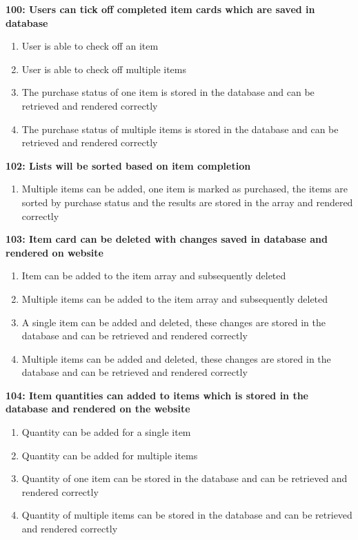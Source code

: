 \documentclass[10pt,onecolumn]{witseiepaper}
\begin{document}
\textbf{100: Users can tick off completed item cards which are saved in database}

\begin{enumerate}
	\item User is able to check off an item
	\item User is able to check off multiple items 
	\item The purchase status of one item is stored in the database and can be retrieved and rendered correctly 
	\item The purchase status of multiple items is stored in the database and can be retrieved and rendered correctly
\end{enumerate}

\textbf{102: Lists will be sorted based on item completion}

\begin{enumerate}
	\item Multiple items can be added, one item is marked as purchased, the items are sorted by purchase status and the results are stored in the array and rendered correctly
\end{enumerate}

\textbf{103: Item card can be deleted with changes saved in database and rendered on website}

\begin{enumerate}
	\item Item can be added to the item array and subsequently deleted
	\item Multiple items can be added to the item array and subsequently deleted
	\item A single item can be added and deleted, these changes are stored in the database and can be retrieved and rendered correctly
	\item Multiple items can be added and deleted, these changes are stored in the database and can be retrieved and rendered correctly
\end{enumerate}


\textbf{104: Item quantities can added to items which is stored in the database and rendered on the website}

\begin{enumerate}
	\item Quantity can be added for a single item
	\item Quantity can be added for multiple items
	\item Quantity of one item can be stored in the database and can be retrieved and rendered correctly
	\item Quantity of multiple items can be stored in the database and can be retrieved and rendered correctly
\end{enumerate}
\end{document}
